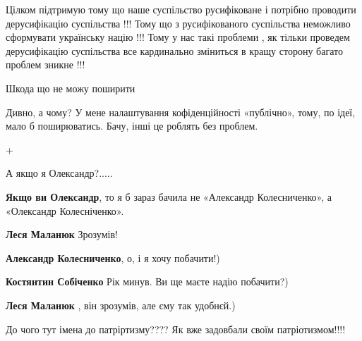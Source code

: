 \begin{itemize}

Цілком підтримую тому що наше суспільство русифіковане і потрібно проводити
дерусифікацію суспільства !!! Тому що з русифікованого суспільства неможливо
сформувати українську націю !!! Тому у нас такі проблеми , як тільки проведем
дерусифікацію суспільства все кардинально зміниться в кращу сторону багато
проблем зникне !!!


Шкода що не можу поширити

\begin{itemize} %
Дивно, а чому? У мене налаштування кофіденційності «публічно», тому, по ідеї, мало б поширюватись. Бачу, інші це роблять без проблем.
\end{itemize} %

+

А якщо я Олександр?.....

\begin{itemize} %
\textbf{Якщо ви Олександр}, то я б зараз бачила не «Александр Колесниченко», а «Олександр Колесніченко».

\textbf{Леся Маланюк} Зрозумів!

\textbf{Александр Колесниченко}, о, і я хочу побачити!)

\textbf{Костянтин Собіченко} Рік минув. Ви ще маєте надію побачити?)

\textbf{Леся Маланюк} , він зрозумів, але єму так удобнєй.)
\end{itemize} %


До чого тут імена до патріртизму???? Як вже задовбали своїм патріотизмом!!!!

\end{itemize} %
